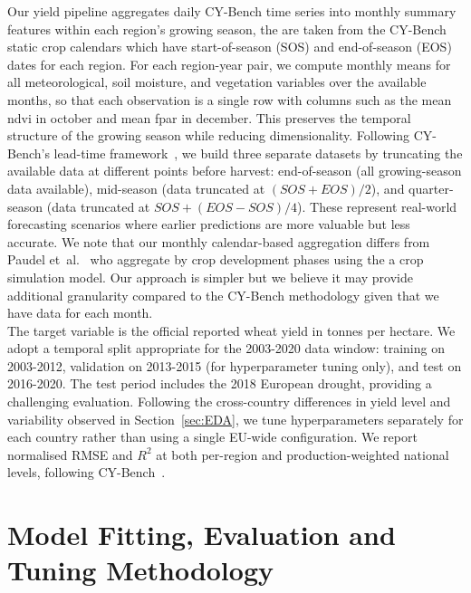 \documentclass[pdflatex,sn-mathphys-num, oneside, 11pt]{sn-jnl}%
\theoremstyle{thmstyleone}%
\theoremstyle{thmstyletwo}%
\theoremstyle{thmstylethree}%
\begin{document}
Our yield pipeline aggregates daily CY-Bench time series into monthly summary features within each region's growing season, the are taken from the CY-Bench static crop calendars which have start-of-season (SOS) and end-of-season (EOS) dates for each region. For each region-year pair, we compute monthly means for all meteorological, soil moisture, and vegetation variables over the available months, so that each observation is a single row with columns such as the mean ndvi in october and mean fpar in december. This preserves the temporal structure of the growing season while reducing dimensionality. Following CY-Bench's lead-time framework~\cite{bib17}, we build three separate datasets by truncating the available data at different points before harvest: end-of-season (all growing-season data available), mid-season (data truncated at $(SOS + EOS)/2$), and quarter-season (data truncated at $SOS + (EOS - SOS)/4$). These represent real-world forecasting scenarios where earlier predictions are more valuable but less accurate. We note that our monthly calendar-based aggregation differs from Paudel et~al.~\cite{bib16} who aggregate by crop development phases using the a crop simulation model. Our approach is simpler but we believe it may provide additional granularity compared to the CY-Bench methodology given that we have data for each month.\\

The target variable is the official reported wheat yield in tonnes per hectare. We adopt a temporal split appropriate for the 2003-2020 data window: training on 2003-2012, validation on 2013-2015 (for hyperparameter tuning only), and test on 2016-2020. The test period includes the 2018 European drought, providing a challenging evaluation. Following the cross-country differences in yield level and variability observed in Section~\ref{sec:EDA}, we tune hyperparameters separately for each country rather than using a single EU-wide configuration. We report normalised RMSE and $R^2$ at both per-region and production-weighted national levels, following CY-Bench~\cite{bib17}.

\section{Model Fitting, Evaluation and Tuning Methodology}\label{sec:modelling_methodology}

\end{document}
